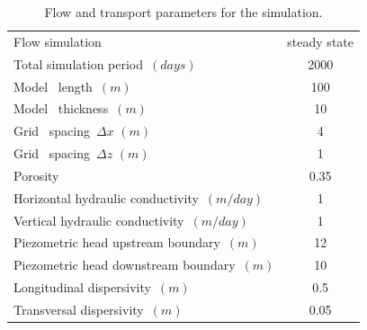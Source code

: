 \begin{table}[t]
\caption{Flow and transport parameters for the simulation.}
\begin{center}
\begin{tabular}{lc} 
\toprule
Flow simulation                     & steady state \\
Total simulation period\ $ (days)      $         &  2000            \\
Model \  length\ $ (m)      $         &  100            \\
Model \  thickness\ $(m)$                        &  10            \\
Grid \ spacing\ $\Delta x $ $(m)$                &    4            \\
Grid \ spacing\ $\Delta z $ $(m)$                &    1            \\
Porosity\     $            $         &  0.35           \\
Horizontal hydraulic conductivity\ $(m/day)$               &  1         \\ 
Vertical   hydraulic conductivity\ $(m/day)$               &  1         \\ 
Piezometric head upstream boundary\ $(m)          $         &  12           \\ 
Piezometric head downstream boundary\ $(m)        $         &  10           \\ 
Longitudinal dispersivity\ $(m)         $         &  0.5          \\ 
Transversal  dispersivity\ $(m)         $         &  0.05          \\ 
\bottomrule
\end{tabular}
\label{ex3_flow}
\end{center}
\end{table}

